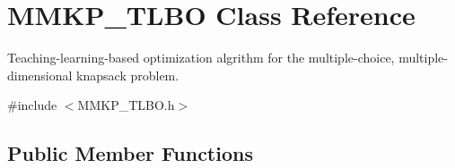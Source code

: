 \hypertarget{class_m_m_k_p___t_l_b_o}{\section{M\+M\+K\+P\+\_\+\+T\+L\+B\+O Class Reference}
\label{class_m_m_k_p___t_l_b_o}
}


Teaching-\/learning-\/based optimization algrithm for the multiple-\/choice, multiple-\/dimensional knapsack problem.  




{\ttfamily \#include $<$M\+M\+K\+P\+\_\+\+T\+L\+B\+O.\+h$>$}

\subsection*{Public Member Functions}
